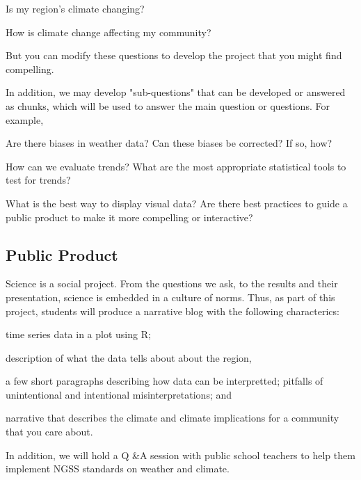 \documentclass{article}\usepackage[]{graphicx}\usepackage[]{color}
\newenvironment{itemize*}%
  {\begin{itemize}%
    \setlength{\itemsep}{0pt}%
    \setlength{\parskip}{0pt}}%
  {\end{itemize}}
\begin{document}
\begin{itemize*}
  \item Is my region's climate changing?
  \item How is climate change affecting my community?
\end{itemize*}

But you can modify these questions to develop the project that you might find compelling.

In addition, we may develop "sub-questions" that can be developed or answered as chunks, which will be used to answer the main question or questions. For example, 

\begin{itemize*}
  \item Are there biases in weather data? Can these biases be corrected? If so, how?
  \item How can we evaluate trends? What are the most appropriate statistical tools to test for trends?
  \item What is the best way to display visual data?  Are there best practices to guide a public product to make it more compelling or interactive?
\end{itemize*}

\subsection{Public Product}

Science is a social project. From the questions we ask, to the results and their presentation, science is embedded in a culture of norms. Thus, as part of this project, students will produce a narrative blog with the following characterics:

\begin{itemize*}
  \item time series data in a plot using R; 
  \item description of what the data tells about about the region, 
  \item a few short paragraphs describing how data can be interpretted; pitfalls of unintentional and intentional misinterpretations; and 
  \item narrative that describes the climate and climate implications for a community that you care about.
\end{itemize*}

In addition, we will hold a Q \&A session with public school teachers to help them implement NGSS standards on weather and climate.
\end{document}
